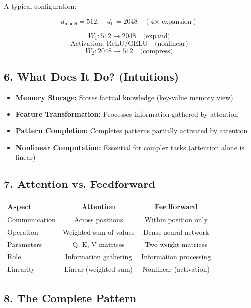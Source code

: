 \documentclass[12pt]{extarticle}
\begin{document}
A typical configuration:

\[
d_{\text{model}} = 512, \quad d_{\text{ff}} = 2048 \quad (\text{4× expansion})
\]

\[
W_1: 512 \rightarrow 2048 \quad \text{(expand)}
\]
\[
\text{Activation: ReLU/GELU} \quad \text{(nonlinear)}
\]
\[
W_2: 2048 \rightarrow 512 \quad \text{(compress)}
\]

\subsection*{6. What Does It Do? (Intuitions)}

\begin{itemize}
    \item \textbf{Memory Storage:} Stores factual knowledge (key-value memory view)
    \item \textbf{Feature Transformation:} Processes information gathered by attention
    \item \textbf{Pattern Completion:} Completes patterns partially activated by attention
    \item \textbf{Nonlinear Computation:} Essential for complex tasks (attention alone is linear)
\end{itemize}

\subsection*{7. Attention vs. Feedforward}

\begin{table}[h]
\centering
\begin{tabular}{lcc}
\toprule
\textbf{Aspect} & \textbf{Attention} & \textbf{Feedforward} \\
\midrule
Communication & Across positions & Within position only \\
Operation & Weighted sum of values & Dense neural network \\
Parameters & Q, K, V matrices & Two weight matrices \\
Role & Information gathering & Information processing \\
Linearity & Linear (weighted sum) & Nonlinear (activation) \\
\bottomrule
\end{tabular}
\end{table}

\subsection*{8. The Complete Pattern}
\end{document}
